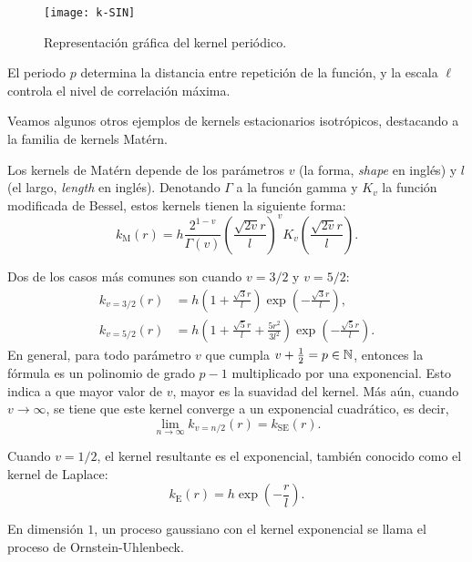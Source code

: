 \begin{figure}[h]
	\centering
	\texttt{[image: k-SIN]}
	\caption{Representación gráfica del kernel periódico.}
\end{figure}
El periodo \(p\) determina la distancia entre repetición de la función, y la escala \(\ell\) controla el nivel de correlación máxima.

Veamos algunos otros ejemplos de kernels estacionarios isotrópicos, destacando a la familia de kernels Matérn.
\begin{definition}
	Los kernels de Matérn depende de los parámetros \(v\) (la forma, \emph{shape} en inglés) y \(l\) (el largo, \emph{length} en inglés). Denotando \(\Gamma\) a la función gamma y \(K_{v}\) la función modificada de Bessel, estos kernels tienen la siguiente forma:
	\begin{equation*}
		k_{\mathrm{M}}(r) = h\frac{2^{1-v}}{\Gamma(v)} \left(\frac{\sqrt{2v} r}{l}\right)^{v} K_{v} \left(\frac{\sqrt{2v} r}{l}\right).
	\end{equation*}
\end{definition}

Dos de los casos más comunes son cuando \(v=3/2\) y \(v=5/2\):
\begin{align*}
	k_{v=3/2}(r)	&= h \left(1 + \frac{\sqrt{3} r}{l}\right) \exp \left(-\frac{\sqrt{3} r}{l}\right), \\
	k_{v=5/2}(r)	&= h \left(1 + \frac{\sqrt{5} r}{l} + \frac{5r^{2}}{3 l^{2}}\right) \exp \left(-\frac{\sqrt{5} r}{l}\right).
\end{align*}
En general, para todo parámetro \(v\) que cumpla \(v + \frac{1}{2} = p \in \mathbb{N}\), entonces la fórmula es un polinomio de grado \(p-1\) multiplicado por una exponencial. Esto indica a que mayor valor de \(v\), mayor es la suavidad del kernel. Más aún, cuando \(v \to \infty\), se tiene que este kernel converge a un exponencial cuadrático, es decir,
\begin{equation*}
	\lim_{n \to \infty} k_{v=n/2}(r) = k_{\mathrm{SE}}(r).
\end{equation*}

\begin{definition}
	Cuando \(v=1/2\), el kernel resultante es el exponencial, también conocido como el kernel de Laplace:
	\begin{equation*}
		k_{\mathrm{E}}(r) = h \exp \left(-\frac{r}{l}\right).
	\end{equation*}
\end{definition}

En dimensión \(1\), un proceso gaussiano con el kernel exponencial se llama el proceso de Ornstein-Uhlenbeck. 

